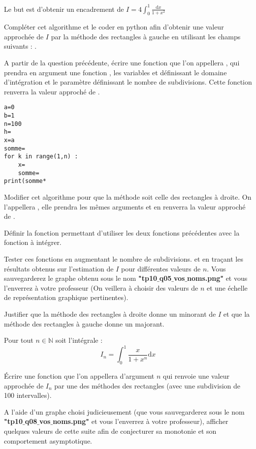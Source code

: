Le but est d'obtenir un encadrement de
\quad $\displaystyle I=4\int_0^1\frac{\text{d}x}{1+x^2}$

\begin{minipage}[c]{.5\linewidth}
\question{}
Compléter cet algorithme et le coder en python afin d'obtenir une valeur approchée de $I$ par la méthode des rectangles à gauche en utilisant les champs suivants : 
.

\question{} A partir de la question précédente, écrire une fonction que l'on appellera , qui prendra en argument une fonction , les variables  et  définissant le domaine d'intégration et le paramètre  définissant le nombre de subdivisions. Cette fonction renverra la valeur approché de .
\end{minipage} \hfill
\begin{minipage}[r]{.35\linewidth}
\begin{lstlisting}
a=0
b=1
n=100
h=
x=a
somme=
for k in range(1,n) :
    x=
    somme=
print(somme*
\end{lstlisting}
\end{minipage}

\question{}
Modifier cet algorithme pour que la méthode soit celle des rectangles à droite. On l'appellera , elle prendra les mêmes arguments et en renverra la valeur approché de .

\question{} Définir la fonction  permettant d'utiliser les deux fonctions précédentes avec la fonction à intégrer. 


\question{}
Tester ces fonctions en augmentant le nombre de subdivisions. et en traçant les résultats obtenus sur l'estimation de $I$ pour différentes valeurs de $n$. Vous sauvegarderez le graphe obtenu sous le nom \textbf{"tp10$\_$q05$\_$vos$\_$noms.png"} et vous l'enverrez à votre professeur (On veillera à choisir des valeurs de $n$ et une échelle de représentation graphique pertinentes).



\question{}
Justifier que la méthode des rectangles à droite donne un minorant de $I$ et que la méthode des rectangles à gauche donne un majorant. 

Pour tout $n\in\mathbb{N}$ soit l'intégrale : 
$$I_n=\int_0^1\frac{x}{1+x^n} \text{d}x$$

\question{} Écrire une fonction que l'on appellera  d'argument $n$ qui renvoie une valeur approchée de $I_n$ par une des méthodes des rectangles (avec une subdivision de 100 intervalles).

\question{} A l'aide d'un graphe choisi judicieusement (que vous sauvegarderez sous le nom \textbf{"tp10$\_$q08$\_$vos$\_$noms.png"} et vous l'enverrez à votre professeur), afficher quelques valeurs de cette suite afin de conjecturer sa monotonie et son comportement asymptotique.